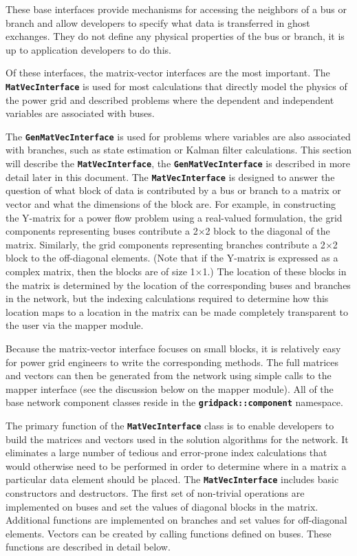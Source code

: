 These base interfaces provide mechanisms for accessing the neighbors of a bus or branch and allow developers to specify what data is transferred in ghost exchanges. They do not define any physical properties of the bus or branch, it is up to application developers to do this.

Of these interfaces, the matrix-vector interfaces are the most important. The \texttt{\textbf{MatVecInterface}} is used for most calculations that directly model the physics of the power grid and described problems where the dependent and independent variables are associated with buses. 

The \texttt{\textbf{GenMatVecInterface}} is used for problems where variables are also associated with branches, such as state estimation or Kalman filter calculations. This section will describe the \texttt{\textbf{MatVecInterface}}, the \texttt{\textbf{GenMatVecInterface}} is described in more detail later in this document. The \texttt{\textbf{MatVecInterface}} is designed to answer the question of what block of data is contributed by a bus or branch to a matrix or vector and what the dimensions of the block are. For example, in constructing the Y-matrix for a power flow problem using a real-valued formulation, the grid components representing buses contribute a 2$\mathrm{\times}$2 block to the diagonal of the matrix. Similarly, the grid components representing branches contribute a 2$\mathrm{\times}$2 block to the off-diagonal elements. (Note that if the Y-matrix is expressed as a complex matrix, then the blocks are of size 1$\mathrm{\times}$1.) The location of these blocks in the matrix is determined by the location of the corresponding buses and branches in the network, but the indexing calculations required to determine how this location maps to a location in the matrix can be made completely transparent to the user via the mapper module. 

Because the matrix-vector interface focuses on small blocks, it is relatively easy for power grid engineers to write the corresponding methods. The full matrices and vectors can then be generated from the network using simple calls to the mapper interface (see the discussion below on the mapper module). All of the base network component classes reside in the \texttt{\textbf{gridpack::component}} namespace.

The primary function of the \texttt{\textbf{MatVecInterface}} class is to enable developers to build the matrices and vectors used in the solution algorithms for the network. It eliminates a large number of tedious and error-prone index calculations that would otherwise need to be performed in order to determine where in a matrix a particular data element should be placed. The \texttt{\textbf{MatVecInterface}} includes basic constructors and destructors. The first set of non-trivial operations are implemented on buses and set the values of diagonal blocks in the matrix. Additional functions are implemented on branches and set values for off-diagonal elements. Vectors can be created by calling functions defined on buses. These functions are described in detail below.

